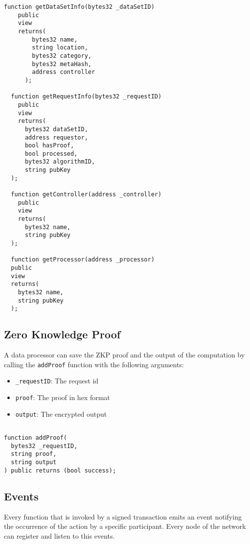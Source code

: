 \begin{lstlisting}[language=Solidity, caption={General functions}]
  function getDataSetInfo(bytes32 _dataSetID)
    public
    view
    returns(
        bytes32 name,
        string location,
        bytes32 category,
        bytes32 metaHash,
        address controller
      );

  function getRequestInfo(bytes32 _requestID)
    public
    view
    returns(
      bytes32 dataSetID,
      address requestor,
      bool hasProof,
      bool processed,
      bytes32 algorithmID,
      string pubKey
  );

  function getController(address _controller)
    public
    view
    returns(
      bytes32 name,
      string pubKey
  );

  function getProcessor(address _processor)
  public
  view
  returns(
    bytes32 name,
    string pubKey
  );
\end{lstlisting}

\subsection{Zero Knowledge Proof}
\label{implemenation:contracts:zkp}

A data processor can save the ZKP proof and the output of the computation by calling the \verb|addProof| function with the following arguments:

\begin{itemize}
  \item \verb|_requestID|: The request id
  \item \verb|proof|: The proof in hex format
  \item \verb|output|: The encrypted output
\end{itemize}

\begin{lstlisting}[language=Solidity, caption={Data sharing application events}]

function addProof(
  bytes32 _requestID,
  string proof,
  string output
) public returns (bool success);

\end{lstlisting}
\subsection{Events}
\label{implemenation:contracts:events}

Every function that is invoked by a signed transaction emits an event notifying the occurrence of the action by a specific participant. Every node of the network can register and listen to this events.

